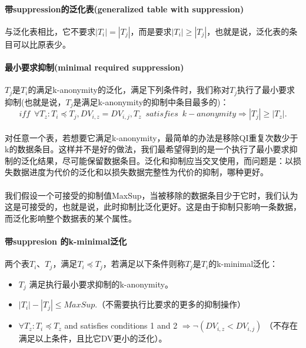 \documentclass[12pt,a4paper]{article}
\begin{document}
\paragraph{带suppression的泛化表(generalized table with suppression)} 与泛化表相比，它不要求$|T_i| = |T_j|$，而是要求$|T_i| \geq |T_j|$，也就是说，泛化表的条目可以比原表少。

\paragraph{最小要求抑制(minimal required suppression)} $T_j$是$T_i$的满足k-anonymity的泛化，满足下列条件时，我们称对$T_j$执行了最小要求抑制(也就是说，$T_j$是满足k-anonymity的抑制中条目最多的)：
\begin{equation}
	iff \enspace \forall T_z: T_i \preceq T_j, DV_{i,z} = DV_{i,j}, T_z \enspace satisfies \enspace k-anonymity \Rightarrow |T_j| \geq |T_z|.
\end{equation}


\paragraph{} 对任意一个表，若想要它满足k-anonymity，最简单的办法是移除QI重复次数少于k的数据条目。这样并不是好的做法，我们最希望得到的是一个执行了最小要求抑制的泛化结果，尽可能保留数据条目。泛化和抑制应当交叉使用，而问题是：以损失数据进度为代价的泛化和以损失数据完整性为代价的抑制，哪种更好。

\paragraph{} 我们假设一个可接受的抑制值MaxSup，当被移除的数据条目少于它时，我们认为这是可接受的，也就是说，此时抑制比泛化更好。这是由于抑制只影响一条数据，而泛化影响整个数据表的某个属性。


\paragraph{带suppresion 的k-minimal泛化}  两个表$T_i$、$T_j$，满足$T_i \preceq T_j$，若满足以下条件则称$T_j$是$T_i$的k-minimal泛化：
\begin{itemize}
	\item $T_j$ 满足执行最小要求抑制的k-anonymity。
	\item $ |T_i| - |T_j| \leq MaxSup$.（不需要执行比要求的更多的抑制操作）
	\item $\forall T_z: T_i \preceq T_z$ and satisfies conditions 1 and 2 $ \Rightarrow \neg (DV_{i,z} < DV_{i,j})$ （不存在满足以上条件，且比它DV更小的泛化）。
\end{itemize}
\end{document}
